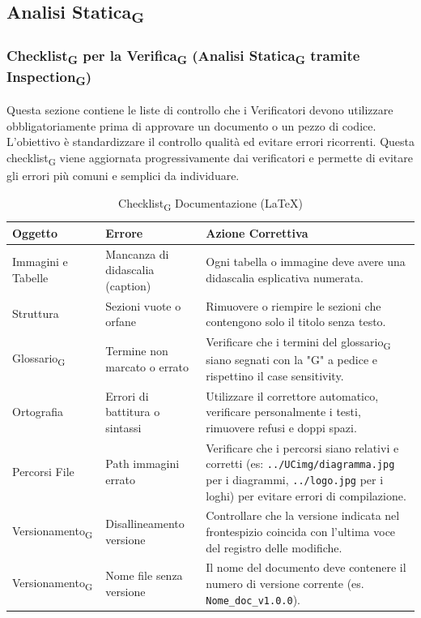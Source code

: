 \documentclass[11pt,a4paper]{article}
\newcommand{\gls}[1]{#1\textsubscript{G}}
\begin{document}
\subsection{\gls{Analisi Statica}}

\subsubsection{\gls{Checklist} per la \gls{Verifica} (\gls{Analisi Statica} tramite Inspection\textsubscript{G})}
Questa sezione contiene le liste di controllo che i Verificatori devono utilizzare obbligatoriamente prima di approvare un documento o un pezzo di codice. L'obiettivo è standardizzare il controllo qualità ed evitare errori ricorrenti.
Questa \gls{checklist} viene aggiornata progressivamente dai verificatori e permette di evitare gli errori più comuni e semplici da individuare.

\begin{table}[H]
    \centering
    \renewcommand{\arraystretch}{1.4}
    \begin{tabular}{|l|>{\raggedright\arraybackslash}p{}|>{\raggedright\arraybackslash}p{}|}
        \hline
        \textbf{Oggetto} & \textbf{Errore} & \textbf{Azione Correttiva} \\
        \hline
        Immagini e Tabelle & Mancanza di didascalia (caption) & Ogni tabella o immagine deve avere una didascalia esplicativa numerata. \\
        \hline
        Struttura & Sezioni vuote o orfane & Rimuovere o riempire le sezioni che contengono solo il titolo senza testo. \\
        \hline
        \gls{Glossario} & Termine non marcato o errato & Verificare che i termini del \gls{glossario} siano segnati con la "G" a pedice e rispettino il case sensitivity. \\
        \hline
        Ortografia & Errori di battitura o sintassi & Utilizzare il correttore automatico, verificare personalmente i testi, rimuovere refusi e doppi spazi. \\
        \hline
        Percorsi File & Path immagini errato & Verificare che i percorsi siano relativi e corretti (es: \texttt{../UCimg/diagramma.jpg} per i diagrammi, \texttt{../logo.jpg} per i loghi) per evitare errori di compilazione.\\
        \hline
        \gls{Versionamento} & Disallineamento versione & Controllare che la versione indicata nel frontespizio coincida con l'ultima voce del registro delle modifiche. \\
        \hline
        \gls{Versionamento} & Nome file senza versione & Il nome del documento deve contenere il numero di versione corrente (es. \texttt{Nome\_doc\_v1.0.0}). \\
        \hline
    \end{tabular}
    \caption{\gls{Checklist} Documentazione (LaTeX)}
\end{table}
\end{document}
